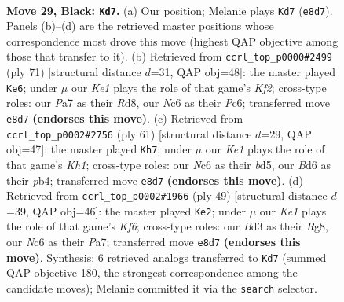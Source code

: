 \documentclass[11pt]{article}
\begin{document}
\clearpage

\begin{figure}[p]\centering
\begin{subfigure}{0.46\textwidth}\centering
\resizebox{\linewidth}{!}{%
\newchessgame
\chessboard[
  setfen={2r1k2R/p7/2nb2p1/6P1/8/3b4/3B4/4K1N1 b - - 4 29},
  showmover=false,
  pgfstyle=straightmove, color=movearrow, markmove={e8-d7}
]}
\caption{}
\end{subfigure}\hfill
\begin{subfigure}{0.46\textwidth}\centering
\resizebox{\linewidth}{!}{%
\newchessgame
\chessboard[
  setfen={3r4/5kp1/2p5/R3n2B/3b4/1P6/3B2PP/5K2 b - - 0 36},
  showmover=false,
  pgfstyle=straightmove, color=movearrow, markmove={f7-e6}
]}
\caption{}
\end{subfigure}
\\[4pt]
\begin{subfigure}{0.46\textwidth}\centering
\resizebox{\linewidth}{!}{%
\newchessgame
\chessboard[
  setfen={5R1k/p7/6pp/3B4/1P1bP3/8/P6r/5K2 b - - 1 31},
  showmover=false,
  pgfstyle=straightmove, color=movearrow, markmove={h8-h7}
]}
\caption{}
\end{subfigure}\hfill
\begin{subfigure}{0.46\textwidth}\centering
\resizebox{\linewidth}{!}{%
\newchessgame
\chessboard[
  setfen={6r1/p4p1p/7B/5R2/8/5k2/PP3b1P/2K5 b - - 1 25},
  showmover=false,
  pgfstyle=straightmove, color=movearrow, markmove={f3-e2}
]}
\caption{}
\end{subfigure}
\caption{\textbf{Move 29, Black: \texttt{Kd7}.} (a) Our position; Melanie plays \texttt{Kd7} (\texttt{e8d7}). Panels (b)--(d) are the retrieved master positions whose correspondence most drove this move (highest QAP objective among those that transfer to it). (b) Retrieved from \texttt{ccrl\_top\_p0000\#2499} (ply 71) [structural distance $d$=31, QAP obj=48]: the master played \texttt{Ke6}; under $\mu$ our \emph{Ke1} plays the role of that game's \emph{Kf2}; cross-type roles: our \emph{P}a7 as their \emph{R}d8, our \emph{N}c6 as their \emph{P}c6; transferred move \texttt{e8d7} \textbf{(endorses this move)}. (c) Retrieved from \texttt{ccrl\_top\_p0002\#2756} (ply 61) [structural distance $d$=29, QAP obj=47]: the master played \texttt{Kh7}; under $\mu$ our \emph{Ke1} plays the role of that game's \emph{Kh1}; cross-type roles: our \emph{N}c6 as their \emph{b}d5, our \emph{B}d6 as their \emph{p}b4; transferred move \texttt{e8d7} \textbf{(endorses this move)}. (d) Retrieved from \texttt{ccrl\_top\_p0002\#1966} (ply 49) [structural distance $d$=39, QAP obj=46]: the master played \texttt{Ke2}; under $\mu$ our \emph{Ke1} plays the role of that game's \emph{Kf6}; cross-type roles: our \emph{B}d3 as their \emph{R}g8, our \emph{N}c6 as their \emph{P}a7; transferred move \texttt{e8d7} \textbf{(endorses this move)}. Synthesis: 6 retrieved analogs transferred to \texttt{Kd7} (summed QAP objective 180, the strongest correspondence among the candidate moves); Melanie committed it via the \texttt{search} selector.}
\label{fig:thought-m57}
\end{figure}
\end{document}
